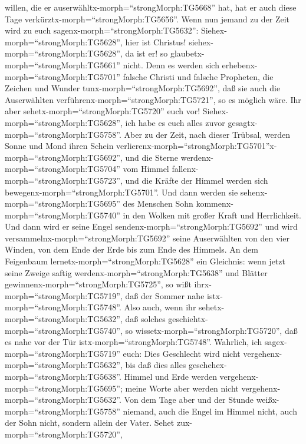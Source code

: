 willen, die er auserwähltx-morph=``strongMorph:TG5668'' hat, hat er auch
diese Tage verkürztx-morph=``strongMorph:TG5656''.  Wenn
nun jemand zu der Zeit wird zu euch sagenx-morph=``strongMorph:TG5632'':
Siehex-morph=``strongMorph:TG5628'', hier ist Christus!
siehex-morph=``strongMorph:TG5628'', da ist er! so
glaubetx-morph=``strongMorph:TG5661'' nicht.  Denn es
werden sich erhebenx-morph=``strongMorph:TG5701'' falsche Christi und
falsche Propheten, die Zeichen und Wunder
tunx-morph=``strongMorph:TG5692'', daß sie auch die Auserwählten
verführenx-morph=``strongMorph:TG5721'', so es möglich wäre.
 Ihr aber sehetx-morph=``strongMorph:TG5720'' euch vor!
Siehex-morph=``strongMorph:TG5628'', ich habe es euch alles zuvor
gesagtx-morph=``strongMorph:TG5758''.  Aber zu der Zeit,
nach dieser Trübsal, werden Sonne und Mond ihren Schein
verlierenx-morph=``strongMorph:TG5701''x-morph=``strongMorph:TG5692'',
 und die Sterne werdenx-morph=``strongMorph:TG5704'' vom
Himmel fallenx-morph=``strongMorph:TG5723'', und die Kräfte der Himmel
werden sich bewegenx-morph=``strongMorph:TG5701''.  Und
dann werden sie sehenx-morph=``strongMorph:TG5695'' des Menschen Sohn
kommenx-morph=``strongMorph:TG5740'' in den Wolken mit großer Kraft und
Herrlichkeit.  Und dann wird er seine Engel
sendenx-morph=``strongMorph:TG5692'' und wird
versammelnx-morph=``strongMorph:TG5692'' seine Auserwählten von den vier
Winden, von dem Ende der Erde bis zum Ende des Himmels.  An
dem Feigenbaum lernetx-morph=``strongMorph:TG5628'' ein Gleichnis: wenn
jetzt seine Zweige saftig werdenx-morph=``strongMorph:TG5638'' und
Blätter gewinnenx-morph=``strongMorph:TG5725'', so wißt
ihrx-morph=``strongMorph:TG5719'', daß der Sommer nahe
istx-morph=``strongMorph:TG5748''.  Also auch, wenn ihr
sehetx-morph=``strongMorph:TG5632'', daß solches
geschiehtx-morph=``strongMorph:TG5740'', so
wissetx-morph=``strongMorph:TG5720'', daß es nahe vor der Tür
istx-morph=``strongMorph:TG5748''.  Wahrlich, ich
sagex-morph=``strongMorph:TG5719'' euch: Dies Geschlecht wird nicht
vergehenx-morph=``strongMorph:TG5632'', bis daß dies alles
geschehex-morph=``strongMorph:TG5638''.  Himmel und Erde
werden vergehenx-morph=``strongMorph:TG5695''; meine Worte aber werden
nicht vergehenx-morph=``strongMorph:TG5632''.  Von dem Tage
aber und der Stunde weißx-morph=``strongMorph:TG5758'' niemand, auch die
Engel im Himmel nicht, auch der Sohn nicht, sondern allein der Vater.
 Sehet zux-morph=``strongMorph:TG5720'',
